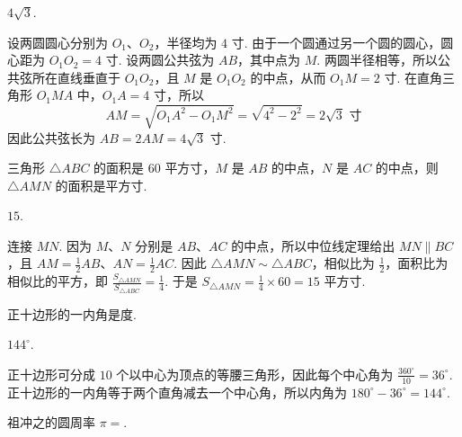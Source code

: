 \documentclass[UTF8,a4paper,oneside,11pt]{ctexbook}
\begin{document}
\begin{answer}
\(4\sqrt{3}\).
\end{answer}

\begin{solution}
设两圆圆心分别为 \(O_{1}\)、\(O_{2}\)，半径均为 \(4\text{ 寸}\). 由于一个圆通过另一个圆的圆心，圆心距为 \(O_{1}O_{2}=4\text{ 寸}\). 设两圆公共弦为 \(AB\)，其中点为 \(M\). 两圆半径相等，所以公共弦所在直线垂直于 \(O_{1}O_{2}\)，且 \(M\) 是 \(O_{1}O_{2}\) 的中点，从而 \(O_{1}M=2\text{ 寸}\). 在直角三角形 \(O_{1}MA\) 中，\(O_{1}A=4\text{ 寸}\)，所以
\[
AM=\sqrt{O_{1}A^{2}-O_{1}M^{2}}=\sqrt{4^{2}-2^{2}}=2\sqrt3\text{ 寸}
\]
因此公共弦长为 \(AB=2AM=4\sqrt3\text{ 寸}\).
\end{solution}

\begin{problem}
三角形 \(\triangle ABC\) 的面积是 \(60\text{ 平方寸}\)，\(M\) 是 \(AB\) 的中点，\(N\) 是 \(AC\) 的中点，则 \(\triangle AMN\) 的面积是\fillinblank{}\(\text{平方寸}\).
\end{problem}

\begin{answer}
\(15\).
\end{answer}

\begin{solution}
连接 \(MN\). 因为 \(M\)、\(N\) 分别是 \(AB\)、\(AC\) 的中点，所以中位线定理给出 \(MN\parallel BC\)，且 \(AM=\frac12AB\)、\(AN=\frac12AC\). 因此 \(\triangle AMN\sim\triangle ABC\)，相似比为 \(\frac12\)，面积比为相似比的平方，即 \(\frac{S_{\triangle AMN}}{S_{\triangle ABC}}=\frac14\). 于是 \(S_{\triangle AMN}=\frac14\times60=15\text{ 平方寸}\).
\end{solution}

\begin{problem}
正十边形的一内角是\fillinblank{}\(\text{度}\).
\end{problem}

\begin{answer}
\(144^{\circ}\).
\end{answer}

\begin{solution}
正十边形可分成 \(10\) 个以中心为顶点的等腰三角形，因此每个中心角为 \(\frac{360^{\circ}}{10}=36^{\circ}\). 正十边形的一内角等于两个直角减去一个中心角，所以内角为 \(180^{\circ}-36^{\circ}=144^{\circ}\).
\end{solution}

\begin{problem}
祖冲之的圆周率 \(\pi=\)\fillinblank{}.
\end{problem}
\end{document}
